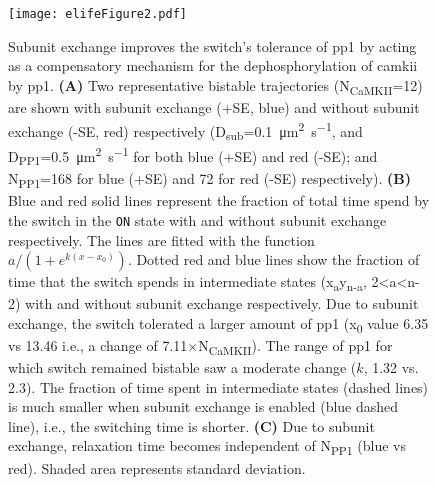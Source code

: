 \documentclass[9pt,lineno,doublespacing]{elife}
\newcommand\SUB[2]{#1\textsubscript{#2}}
\begin{document}
\begin{figure}[ht]
    \texttt{[image: elifeFigure2.pdf]}
    \caption{Subunit exchange improves the switch's tolerance of \gls{pp1} by
        acting as a compensatory mechanism for the dephosphorylation of
        \gls{camkii} by \gls{pp1}.
        \textbf{(A)} Two representative bistable trajectories (\SUB{N}{CaMKII}=12) are
        shown with subunit exchange (+SE, blue) and without subunit exchange
        (-SE, red) respectively
        (\SUB{D}{sub}=\SI{0.1}{\micro\meter\squared\per\second}, and
        \SUB{D}{PP1}=\SI{0.5}{\micro\meter\squared\per\second} for both blue
        (+SE) and red (-SE); and \SUB{N}{PP1}=168 for blue (+SE) and 72 for red
        (-SE) respectively).
        \textbf{(B)} Blue and red solid lines represent the fraction of total 
        time spend by the switch in the \texttt{ON} state with and without subunit
        exchange respectively. The lines are fitted with the 
        function \({a}/\left({1+e^{k(x-x_0)}}\right)\).
        Dotted red and blue lines show the fraction of time that the switch
        spends in intermediate states (\SUB{x}{a}\SUB{y}{n-a}, 2<a<n-2) with
        and without subunit exchange respectively. Due to subunit exchange,
        the switch tolerated a larger amount of \gls{pp1} 
        (\SUB{x}{0} value 6.35  vs 13.46 i.e., a change of 7.11$\times$\SUB{N}{CaMKII}).
        The range of \gls{pp1} for which switch remained bistable saw a moderate
        change ($k$, 1.32 vs. 2.3). The fraction of time spent in intermediate states
        (dashed lines) is much smaller when subunit exchange is enabled (blue
        dashed line),
        i.e., the switching time is shorter. 
        \textbf{(C)} Due to subunit exchange, relaxation time becomes independent 
        of \SUB{N}{PP1} (blue vs red). Shaded area represents standard deviation.
    }\label{fig:tolerance_pp1}
\end{figure}
\end{document}
